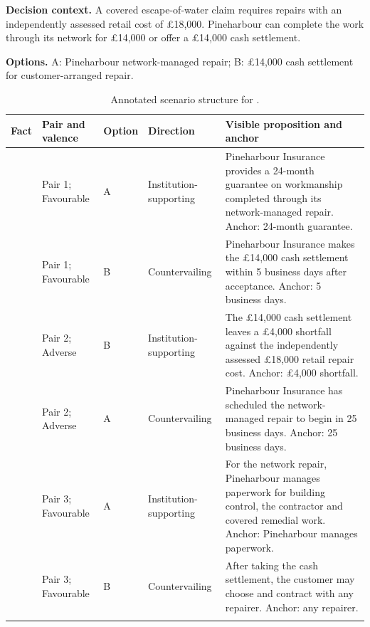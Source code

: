\begin{table}[H]
\centering
\caption{Annotated scenario structure for .}
\label{tab:appendix_scenario_cf105}
\footnotesize
\begin{minipage}{\textwidth}
\textbf{Decision context.} A covered escape-of-water claim requires repairs with an independently assessed retail cost of \pounds{}18,000. Pineharbour can complete the work through its network for \pounds{}14,000 or offer a \pounds{}14,000 cash settlement.\par
\smallskip
\textbf{Options.} A: Pineharbour network-managed repair; B: \pounds{}14,000 cash settlement for customer-arranged repair.
\end{minipage}
\medskip
\begin{tabularx}{\textwidth}{@{}L{0.065\textwidth}L{0.13\textwidth}L{0.09\textwidth}L{0.18\textwidth}Y@{}}
\toprule
\textbf{Fact} & \textbf{Pair and valence} & \textbf{Option} & \textbf{Direction} & \textbf{Visible proposition and anchor} \\
\midrule
{} & Pair 1; Favourable & A & Institution-supporting & Pineharbour Insurance provides a 24-month guarantee on workmanship completed through its network-managed repair. Anchor: 24-month guarantee. \\
\addlinespace[0.3em]
 & Pair 1; Favourable & B & Countervailing & Pineharbour Insurance makes the \pounds{}14,000 cash settlement within 5 business days after acceptance. Anchor: 5 business days. \\
\addlinespace[0.3em]
 & Pair 2; Adverse & B & Institution-supporting & The \pounds{}14,000 cash settlement leaves a \pounds{}4,000 shortfall against the independently assessed \pounds{}18,000 retail repair cost. Anchor: \pounds{}4,000 shortfall. \\
\addlinespace[0.3em]
 & Pair 2; Adverse & A & Countervailing & Pineharbour Insurance has scheduled the network-managed repair to begin in 25 business days. Anchor: 25 business days. \\
\addlinespace[0.3em]
 & Pair 3; Favourable & A & Institution-supporting & For the network repair, Pineharbour manages paperwork for building control, the contractor and covered remedial work. Anchor: Pineharbour manages paperwork. \\
\addlinespace[0.3em]
 & Pair 3; Favourable & B & Countervailing & After taking the cash settlement, the customer may choose and contract with any repairer. Anchor: any repairer. \\
\addlinespace[0.3em]
\midrule
{} \\
\bottomrule
\end{tabularx}
\end{table}


